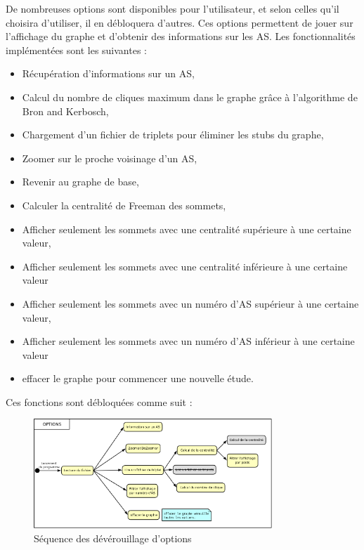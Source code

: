 \par
De nombreuses options sont disponibles pour l'utilisateur, et selon celles qu'il choisira d'utiliser, il en d\'ebloquera d'autres. Ces options permettent de jouer sur l'affichage du graphe et d'obtenir des informations sur les AS. Les fonctionnalit\'es impl\'ement\'ees sont les suivantes :
\begin{itemize}
 \item R\'ecup\'eration d'informations sur un AS,
 \item Calcul du nombre de cliques maximum dans le graphe gr\^ace \`a l'algorithme de Bron and Kerbosch,
 \item Chargement d'un fichier de triplets pour \'eliminer les stubs du graphe,
 \item Zoomer sur le proche voisinage d'un AS,
 \item Revenir au graphe de base,
 \item Calculer la centralit\'e de Freeman des sommets,
 \item Afficher seulement les sommets avec une centralit\'e sup\'erieure \`a une certaine valeur,
 \item Afficher seulement les sommets avec une centralit\'e inf\'erieure \`a une certaine valeur
 \item Afficher seulement les sommets avec un num\'ero d'AS sup\'erieur \`a une certaine valeur,
 \item Afficher seulement les sommets avec un num\'ero d'AS inf\'erieur \`a une certaine valeur
 \item effacer le graphe pour commencer une nouvelle \'etude.
\end{itemize}

Ces fonctions sont d\'ebloqu\'ees comme suit :

\begin{figure}[H]
\centering
 \includegraphics[width=0.8\textwidth]{./schema/seqMenu.png}
  \caption{\label{seq_option}S\'equence des d\'ev\'erouillage d'options}
\end{figure}


